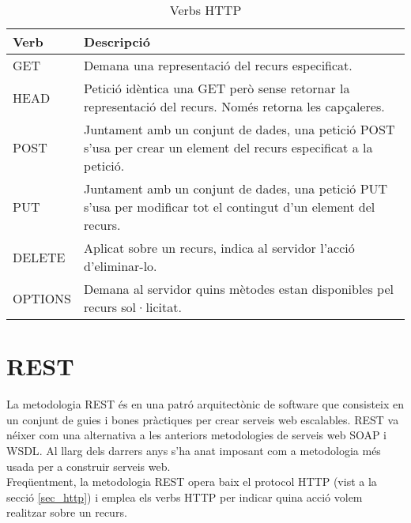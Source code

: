 \begin{table}[h!]
 	\begin{center}
 		\begin{tabularx}{\textwidth}{|l|X|}
  			\hline
 			\bfseries Verb & \bfseries Descripció \\ \hline
			GET &  Demana una representació del recurs especificat. \\ \hline
			HEAD & Petició idèntica una GET però sense retornar la representació del recurs. Només retorna les capçaleres.\\ \hline
			POST & Juntament amb un conjunt de dades, una petició POST s'usa per crear un element del recurs especificat a la petició.\\ \hline
			PUT & Juntament amb un conjunt de dades, una petició PUT s'usa per modificar tot el contingut d'un element del recurs.\\ \hline
			DELETE & Aplicat sobre un recurs, indica al servidor l'acció d'eliminar-lo.\\ \hline
			OPTIONS & Demana al servidor quins mètodes estan disponibles pel recurs sol·licitat.\\ \hline
		\end{tabularx}
	\end{center}
	\label{table:verbs_http}
	\caption{Verbs \ac{HTTP}} 
\end{table}
\section{\ac{REST}}
La metodologia \ac{REST} és en una patró arquitectònic de software que consisteix en un conjunt de guies i bones pràctiques per crear serveis web escalables. \ac{REST} va néixer com una alternativa a les anteriors metodologies de serveis web \ac{SOAP} i \ac{WSDL}. Al llarg dels darrers anys s'ha anat imposant com a metodologia més usada per a construir serveis web.\\

Freqüentment, la metodologia \ac{REST} opera baix el protocol \ac{HTTP} (vist a la secció \ref{sec_http}) i emplea els verbs \ac{HTTP} per indicar quina acció volem realitzar sobre un recurs.\\

